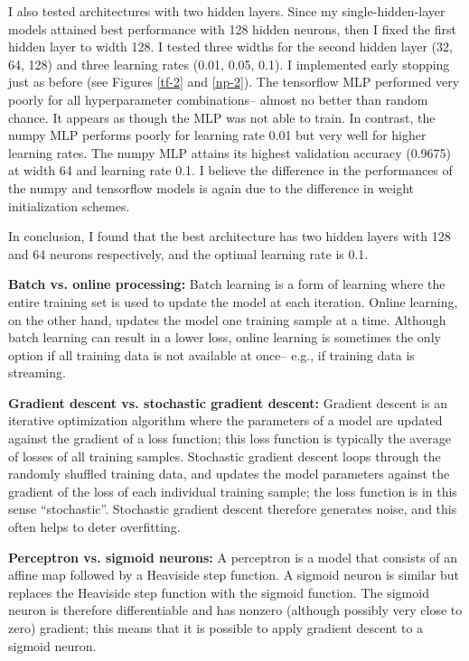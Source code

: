 \documentclass[11pt]{article}
\begin{document}
I also tested architectures with two hidden layers. Since my single-hidden-layer models attained best performance with 128 hidden neurons, then I fixed the first hidden layer to width 128. I tested three widths for the second hidden layer (32, 64, 128) and three learning rates (0.01, 0.05, 0.1). I implemented early stopping just as before (see Figures \ref{tf-2} and \ref{np-2}). The tensorflow MLP performed very poorly for all hyperparameter combinations-- almost no better than random chance. It appears as though the MLP was not able to train. In contrast, the numpy MLP performs poorly for learning rate 0.01 but very well for higher learning rates. The numpy MLP attains its highest validation accuracy (0.9675) at width 64 and learning rate 0.1. I believe the difference in the performances of the numpy and tensorflow models is again due to the difference in weight initialization schemes.

In conclusion, I found that the best architecture has two hidden layers with 128 and 64 neurons respectively, and the optimal learning rate is 0.1.

\newpage

\newpage

\textbf{Batch vs. online processing: } Batch learning is a form of learning where the entire training set is used to update the model at each iteration. Online learning, on the other hand, updates the model one training sample at a time. Although batch learning can result in a lower loss, online learning is sometimes the only option if all training data is not available at once-- e.g., if training data is streaming.

\textbf{Gradient descent vs. stochastic gradient descent: } Gradient descent is an iterative optimization algorithm where the parameters of a model are updated against the gradient of a loss function; this loss function is typically the average of losses of all training samples. Stochastic gradient descent loops through the randomly shuffled training data, and updates the model parameters against the gradient of the loss of each individual training sample; the loss function is in this sense ``stochastic''. Stochastic gradient descent therefore generates noise, and this often helps to deter overfitting.

\textbf{Perceptron vs. sigmoid neurons: } A perceptron is a model that consists of an affine map followed by a Heaviside step function. A sigmoid neuron is similar but replaces the Heaviside step function with the sigmoid function. The sigmoid neuron is therefore differentiable and has nonzero (although possibly very close to zero) gradient; this means that it is possible to apply gradient descent to a sigmoid neuron.
\end{document}
